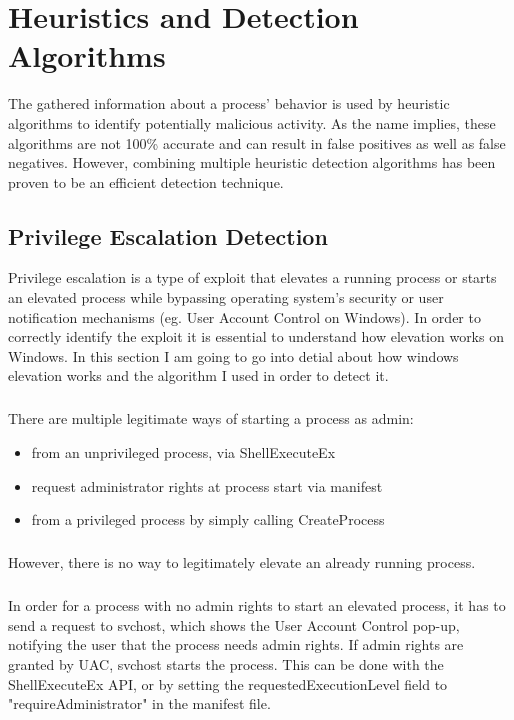 \chapter{Heuristics and Detection Algorithms}
    The gathered information about a process' behavior is used by heuristic algorithms to identify potentially malicious activity. As the name
    implies, these algorithms are not 100\% accurate and can result in false positives as well as false negatives. However, combining multiple
    heuristic detection algorithms has been proven to be an efficient detection technique.

    \section{Privilege Escalation Detection}
        Privilege escalation is a type of exploit that elevates a running process or starts an elevated process while bypassing operating system's
        security or user notification mechanisms (eg. User Account Control on Windows). In order to correctly identify the exploit it is essential
        to understand how elevation works on Windows. In this section I am going to go into detial about how windows elevation works and the
        algorithm I used in order to detect it.

        \paragraph{}
        There are multiple legitimate ways of starting a process as admin:
        \begin{itemize}
            \item from an unprivileged process, via ShellExecuteEx %
            \item request administrator rights at process start via manifest
            \item from a privileged process by simply calling CreateProcess
        \end{itemize}

        \paragraph{}
        However, there is no way to legitimately elevate an already running process.

        \paragraph{}
        In order for a process with no admin rights to start an elevated process, it has to send a request to svchost, which shows the User Account
        Control pop-up, notifying the user that the process needs admin rights. If admin rights are granted by UAC, svchost starts the process.
        This can be done with the ShellExecuteEx API, or by setting the requestedExecutionLevel field to "requireAdministrator" in the manifest
        file.

